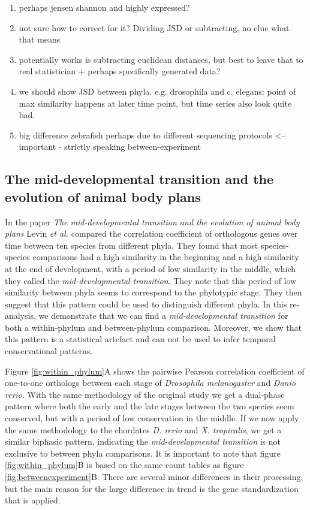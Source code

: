 \begin{enumerate}
    \item perhaps jensen shannon and highly expressed?
    \item not sure how to correct for it? Dividing JSD or subtracting, no clue what that means
    \item potentially works is subtracting euclidean distances, but best to leave that to real statistician + perhaps specifically generated data?
    \item we should show JSD between phyla. e.g. drosophila and c. elegans: point of max similarity happens at later time point, but time series also look quite bad.
    \item big difference zebrafish perhaps due to different sequencing protocols <-- important
    - strictly speaking between-experiment
\end{enumerate}

\subsection{The mid-developmental transition and the evolution of animal body plans} \label{subsection:levin}

In the paper \textit{The mid-developmental transition and the evolution of animal body plans} Levin \textit{et al.} compared the correlation coefficient of orthologous genes over time between ten species from different phyla. They found that most species-species comparisons had a high similarity in the beginning and a high similarity at the end of development, with a period of low similarity in the middle, which they called the \textit{mid-developmental transition}. They note that this period of low similarity between phyla seems to correspond to the phylotypic stage. They then suggest that this pattern could be used to distinguish different phyla. In this re-analysis, we demonstrate that we can find a \textit{mid-developmental transition} for both a within-phylum and between-phylum comparison. Moreover, we show that this pattern is a statistical artefact and can not be used to infer temporal conservational patterns.

Figure \ref{fig:within_phylum}A shows the pairwise Pearson correlation coefficient of one-to-one orthologs between each stage of \textit{Drosophila melanogaster} and \textit{Danio rerio}. With the same methodology of the original study we get a dual-phase pattern where both the early and the late stages between the two species seem conserved, but with a period of low conservation in the middle. If we now apply the same methodology to the chordates \textit{D. rerio} and \textit{X. tropicalis}, we get a similar biphasic pattern, indicating the \textit{mid-developmental transition} is not exclusive to between phyla comparisons. It is important to note that figure \ref{fig:within_phylum}B is based on the same count tables as figure \ref{fig:betweenexperiment}B. There are several minor differences in their processing, but the main reason for the large difference in trend is the gene standardization that is applied.

